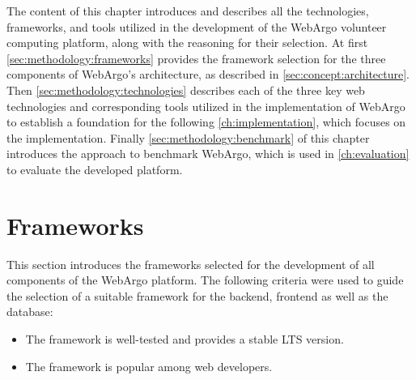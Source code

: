 The content of this chapter introduces and describes all the technologies, frameworks, and tools utilized in the development of the WebArgo volunteer computing platform, along with the reasoning for their selection. At first \autoref{sec:methodology:frameworks} provides the framework selection for the three components of WebArgo's architecture, as described in \autoref{sec:concept:architecture}. Then \autoref{sec:methodology:technologies} describes each of the three key web technologies and corresponding tools utilized in the implementation of WebArgo to establish a foundation for the following \autoref{ch:implementation}, which focuses on the implementation. Finally \autoref{sec:methodology:benchmark} of this chapter introduces the approach to benchmark WebArgo, which is used in \autoref{ch:evaluation} to evaluate the developed platform.

\section{Frameworks}
\label{sec:methodology:frameworks}
This section introduces the frameworks selected for the development of all components of the WebArgo platform. The following criteria were used to guide the selection of a suitable framework for the backend, frontend as well as the database:
\begin{itemize}
    \item The framework is well-tested and provides a stable \ac{LTS} version.
    \item The framework is popular among web developers.
\end{itemize}


